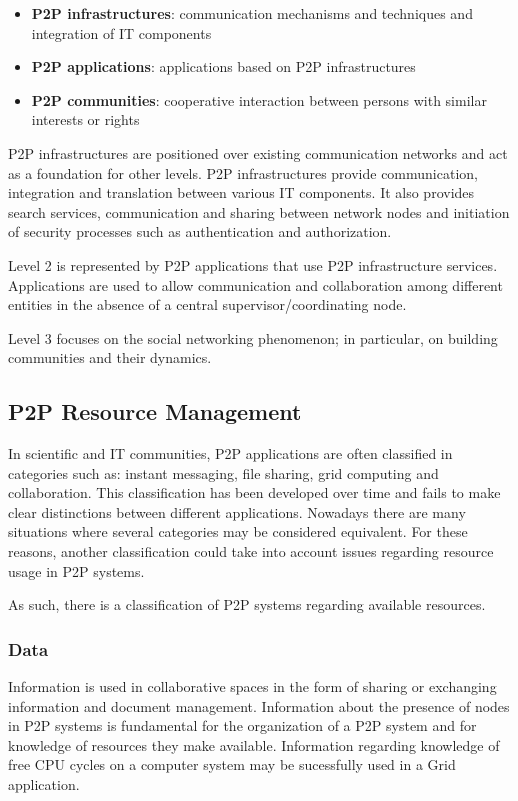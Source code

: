 \begin{itemize}
  \item \textbf{P2P infrastructures}: communication mechanisms and techniques
  and integration of IT components
  \item \textbf{P2P applications}: applications based on P2P infrastructures
  \item \textbf{P2P communities}: cooperative interaction between persons with
  similar interests or rights
\end{itemize}

P2P infrastructures are positioned over existing communication networks and
act as a foundation for other levels. P2P infrastructures provide
communication, integration and translation between various IT components. It
also provides search services, communication and sharing between network
nodes and initiation of security processes such as authentication and
authorization.

Level 2 is represented by P2P applications that use P2P infrastructure
services. Applications are used to allow communication and collaboration
among different entities in the absence of a central supervisor/coordinating
node.

Level 3 focuses on the social networking phenomenon; in particular, on
building communities and their dynamics.

\subsection{P2P Resource Management}

In scientific and IT communities, P2P applications are often classified in
categories such as: instant messaging, file sharing, grid computing and
collaboration.  This classification has been developed over time and fails to
make clear distinctions between different applications. Nowadays there are
many situations where several categories may be considered equivalent. For
these reasons, another classification could take into account issues regarding
resource usage in P2P systems.

As such, there is a classification of P2P systems regarding available
resources.

\subsubsection{Data}

Information is used in collaborative spaces in the form of sharing or
exchanging information and document management. Information about the presence
of nodes in P2P systems is fundamental for the organization of a P2P system
and for knowledge of resources they make available. Information regarding
knowledge of free CPU cycles on a computer system may be sucessfully used in a
Grid application.

